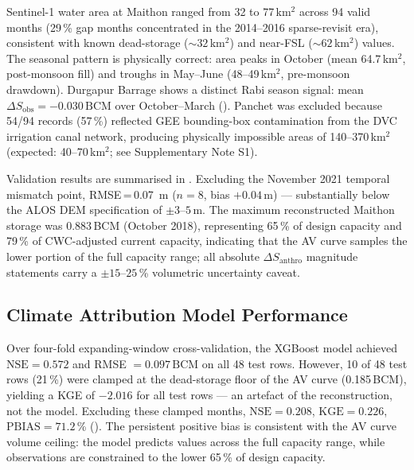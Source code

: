 \documentclass[preprint,12pt,authoryear]{elsarticle}
\newcommand{\dSobs}{\Delta S_{\mathrm{obs}}}
\newcommand{\dSanthro}{\Delta S_{\mathrm{anthro}}}
\newcommand{\BCM}{\,\mathrm{BCM}}
\newcommand{\NSE}{\mathrm{NSE}}
\newcommand{\KGE}{\mathrm{KGE}}
\newcommand{\pbias}{\mathrm{PBIAS}}
\begin{document}
Sentinel-1 water area at Maithon ranged from 32 to 77\,km$^2$ across 94
valid months (29\,\% gap months concentrated in the 2014--2016 sparse-revisit
era), consistent with known dead-storage ($\sim 32$\,km$^2$) and near-FSL
($\sim 62$\,km$^2$) values. The seasonal pattern is physically correct: area
peaks in October (mean 64.7\,km$^2$, post-monsoon fill) and troughs in
May--June (48--49\,km$^2$, pre-monsoon drawdown). Durgapur Barrage shows a
distinct Rabi season signal: mean $\dSobs = -0.030\BCM$ over October--March
(). Panchet was excluded because 54/94 records (57\,\%)
reflected GEE bounding-box contamination from the DVC irrigation canal network,
producing physically impossible areas of 140--370\,km$^2$ (expected:
40--70\,km$^2$; see Supplementary Note S1).

Validation results are summarised in . Excluding the
November 2021 temporal mismatch point, RMSE\,=\,\SI{0.07}{\metre} ($n = 8$,
bias $+0.04$\,m) --- substantially below the ALOS DEM specification of
$\pm 3$--$5$\,m. The maximum reconstructed Maithon storage was 0.883\,BCM
(October 2018), representing 65\,\% of design capacity and 79\,\% of
CWC-adjusted current capacity, indicating that the AV curve samples the lower
portion of the full capacity range; all absolute $\dSanthro$ magnitude
statements carry a $\pm 15$--$25$\,\% volumetric uncertainty caveat.

\subsection{Climate Attribution Model Performance}
\label{sec:res_xgb}

Over four-fold expanding-window cross-validation, the XGBoost model achieved
$\NSE = 0.572$ and RMSE $= 0.097\BCM$ on all 48 test rows. However, 10 of 48
test rows (21\,\%) were clamped at the dead-storage floor of the AV curve
(0.185\,BCM), yielding a KGE of $-2.016$ for all test rows --- an
artefact of the reconstruction, not the model. Excluding these clamped months,
$\NSE = 0.208$, $\KGE = 0.226$, $\pbias = 71.2$\,\%
(). The persistent positive bias is consistent with the
AV curve volume ceiling: the model predicts values across the full capacity
range, while observations are constrained to the lower 65\,\% of design
capacity.
\end{document}
